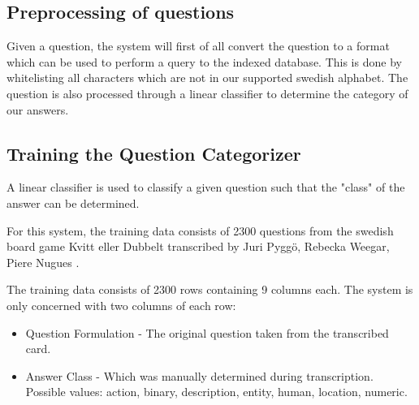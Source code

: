 \subsection{Preprocessing of questions}
Given a question, the system will first of all convert the question
to a format which can be used to perform a query to the indexed
database. This is done by whitelisting all characters which
are not in our supported swedish alphabet. The question is also
processed through a linear classifier to determine the category of our 
answers.

\subsection{Training the Question Categorizer}
A linear classifier is used to classify a given question
such that the "class" of the answer can be determined.

For this system, the training data consists of 2300 questions 
from the swedish board game Kvitt eller Dubbelt transcribed 
by Juri Pygg\"o, Rebecka Weegar, Piere Nugues \cite{QASYS}.

The training data consists of 2300 rows containing 9 columns each.
The system is only concerned with two columns of each row:
\begin{itemize}
\item Question Formulation - The original question taken from the transcribed
  card.
\item Answer Class - Which was manually determined during transcription. 
  Possible values: action, binary, description, entity, human, location, numeric.
\end{itemize}
